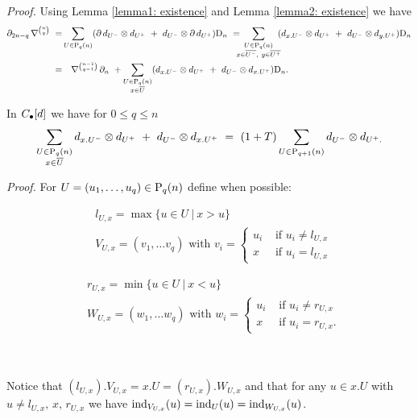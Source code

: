 \textit{Proof.}
Using Lemma \ref{lemma1: existence} and Lemma \ref{lemma2: existence} we have
\begin{equation*}
\begin{split}
\partial_{2n-q}\, \nabla^{ n \choose q}\ =& 
\sum_{U \in \P_q(n)} (\partial\, d_{U^-} \tensor d_{U^+}\ +\ d_{U^-} \tensor \partial\, d_{U^+}) \D_n\ =\!\!\!\! 
\sum_{\substack{U \in \P_q(n) \\ x \in \overline{U^-},\ y \in \overline{U^+} } }\!\! (d_{x.U^-} \tensor d_{U^+}\ +\ d_{U^-} \tensor d_{y.U^+}) \D_n \\ =&
\quad \nabla^{n-1 \choose q-1}\,\partial_n\ + 
\sum_{\substack{U\in\P_{q}(n) \\ x \in \overline{U}}} (d_{x.U^-} \tensor d_{U^+}\ +\ d_{U^-} \tensor d_{x.U^+}) \D_n.
\end{split}				 
\end{equation*}

\begin{lemma} \label{lemma4: existence}  
	In $\chains[d]$ we have for $0 \leq q \leq n$
	\begin{equation} \label{lemma4: existence: eq1}
	\sum_{\substack{U \in \P_{q}(n) \\ x \in \overline{U}}} d_{x.U^-} \tensor d_{U^+}\ +\ d_{U^-} \tensor d_{x.U^+}\ = \
	(1+T) \sum_{U \in \P_{q+1}(n)} d_{U^-} \tensor d_{U^+.}
	\end{equation}
\end{lemma}

\textit{Proof.}
For $U = (u_1, \dots, u_q) \in \P_{q}(n)$ define when possible:\\
\begin{minipage}{.5\textwidth}
	\begin{align*}
	& l_{U,x} = \max\{u\in U\ |\ x>u\} \\
	& V_{U,x} = (v_1, \dots v_q) \text{ with }
	v_i = 
	\begin{cases}
	u_i & \text{ if } u_i \neq l_{U,x} \\
	x	& \text{ if } u_i = l_{U,x}
	\end{cases}
	\end{align*} 
\end{minipage}
\begin{minipage}{.5\textwidth}
	\begin{align*}
	& r_{U,x} = \min\{u\in U\ |\ x<u\} \\
	& W_{U,x} = (w_1, \dots w_q) \text{ with }
	w_i = 
	\begin{cases}
	u_i & \text{ if } u_i \neq r_{U,x} \\
	x	& \text{ if } u_i = r_{U,x}.
	\end{cases}
	\end{align*}
\end{minipage}\\ \\
Notice that $(l_{U,x}).V_{U,x} = x.U = (r_{U,x}).W_{U,x}$ and that for any $u \in x.U$ with $u \neq l_{U,x},\, x,\, r_{U,x}$ we have $\ind_{V_{U,x}}(u) = \ind_{U}(u) = \ind_{W_{U,x}}(u)$.

